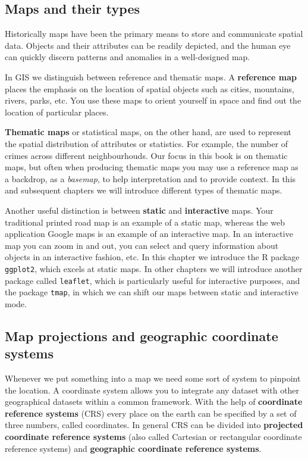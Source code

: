 \documentclass[
]{book}
\begin{document}
\hypertarget{maps-and-their-types}{%
\subsection{Maps and their types}\label{maps-and-their-types}}

Historically maps have been the primary means to store and communicate spatial data. Objects and their attributes can be readily depicted, and the human eye can quickly discern patterns and anomalies in a well-designed map.

In GIS we distinguish between reference and thematic maps. A \textbf{reference map} places the emphasis on the location of spatial objects such as cities, mountains, rivers, parks, etc. You use these maps to orient yourself in space and find out the location of particular places.

\textbf{Thematic maps} or statistical maps, on the other hand, are used to represent the spatial distribution of attributes or statistics. For example, the number of crimes across different neighbourhouds. Our focus in this book is on thematic maps, but often when producing thematic maps you may use a reference map as a backdrop, as a \emph{basemap}, to help interpretation and to provide context. In this and subsequent chapters we will introduce different types of thematic maps.

Another useful distinction is between \textbf{static} and \textbf{interactive} maps. Your traditional printed road map is an example of a static map, whereas the web application Google maps is an example of an interactive map. In an interactive map you can zoom in and out, you can select and query information about objects in an interactive fashion, etc. In this chapter we introduce the R package \texttt{ggplot2}, which excels at static maps. In other chapters we will introduce another package called \texttt{leaflet}, which is particularly useful for interactive purposes, and the package \texttt{tmap}, in which we can shift our maps between static and interactive mode.

\hypertarget{map-projections-and-geographic-coordinate-systems}{%
\subsection{Map projections and geographic coordinate systems}\label{map-projections-and-geographic-coordinate-systems}}

Whenever we put something into a map we need some sort of system to pinpoint the location. A coordinate system allows you to integrate any dataset with other geographical datasets within a common framework. With the help of \textbf{coordinate reference systems} (CRS) every place on the earth can be specified by a set of three numbers, called coordinates. In general CRS can be divided into \textbf{projected coordinate reference systems} (also called Cartesian or rectangular coordinate reference systems) and \textbf{geographic coordinate reference systems}.
\end{document}
